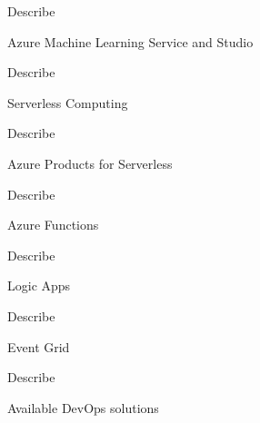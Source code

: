\documentclass{scrartcl}
\newenvironment{flashcard}[2][]{%
    #1
    \vfill
    \centerline{\Large{#2}}
    \vfill
    \newpage
}
{\newpage}
\begin{document}
    \begin{flashcard}[Describe]{Azure Machine Learning Service and Studio}

    \end{flashcard}

    \begin{flashcard}[Describe]{Serverless Computing}

    \end{flashcard}

    \begin{flashcard}[Describe]{Azure Products for Serverless}

    \end{flashcard}

    \begin{flashcard}[Describe]{Azure Functions}

    \end{flashcard}

    \begin{flashcard}[Describe]{Logic Apps}

    \end{flashcard}

    \begin{flashcard}[Describe]{Event Grid}

    \end{flashcard}

    \begin{flashcard}[Describe]{Available DevOps solutions}

    \end{flashcard}
\end{document}
